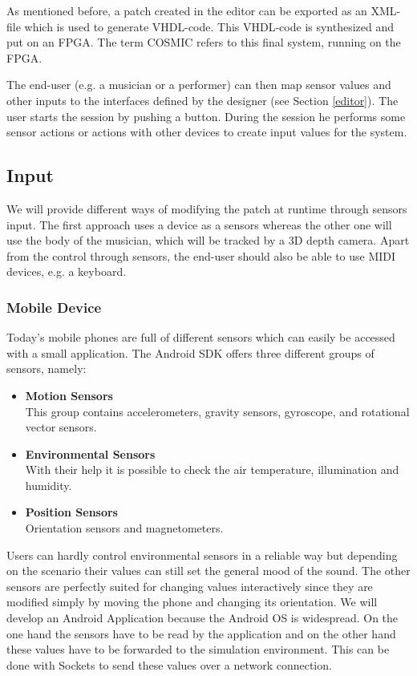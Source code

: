 	As mentioned before, a patch created in the editor can be exported as an XML-file which is used to generate VHDL-code. 
	This VHDL-code is synthesized and put on an \ac{FPGA}. 
	The term \ac{COSMIC} refers to this final system, running on the \ac{FPGA}.
	
	The end-user (e.g. a musician or a performer) can then map sensor values and other inputs to the interfaces defined by the designer (see Section \ref{editor}). 
	The user starts the session by pushing a button. 
	During the session he performs some sensor actions or actions with other devices to create input values for the system.
	
\subsection{Input}
We will provide different ways of modifying the patch at runtime through sensors input. 
The first approach uses a device as a sensors whereas the other one will use the body of the musician, which will be tracked by a 3D depth camera. 
Apart from the control through sensors, the end-user should also be able to use MIDI devices, e.g. a keyboard.

\subsubsection{Mobile Device}
Today's mobile phones are full of different sensors which can easily be accessed with a small application. The Android SDK offers three different groups of sensors, namely:
\begin{itemize}
	\item \textbf{Motion Sensors} \\
			This group contains accelerometers, gravity sensors, gyroscope, and rotational vector sensors. %
	\item \textbf{Environmental Sensors} \\
			With their help it is possible to check the air temperature, illumination and humidity.
	\item \textbf{Position Sensors} \\
			Orientation sensors and magnetometers.
\end{itemize}

Users can hardly control environmental sensors in a reliable way but depending on the scenario their values can still set the general mood of the sound.
The other sensors are perfectly suited for changing values interactively since they are modified simply by moving the phone and changing its orientation. 
We will develop an Android Application because the Android OS is widespread. 
On the one hand the sensors have to be read by the application and on the other hand these values have to be forwarded to the simulation environment. 
This can be done with Sockets to send these values over a network connection.

